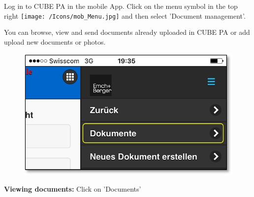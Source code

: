 Log in to CUBE PA in the mobile App. Click on the menu symbol in the top right \texttt{[image: /Icons/mob\_Menu.jpg]} and then select 'Document management'.

\vspace{.5cm}

You can browse, view and send documents already uploaded in CUBE PA or add upload new documents or photos.

\vspace{\baselineskip}

\begin{figure}   %
  \vspace{-35pt}      %
  \begin{center}
    \includegraphics[width=1\linewidth]{../chapters/11_Dokumentenablage/pictures/11-mob02_Dokumente_anschauen.jpg}
  \end{center}
  \vspace{-20pt}
  \vspace{-10pt}
\end{figure}


\textbf{Viewing documents:} Click on 'Documents'

\pagebreak


